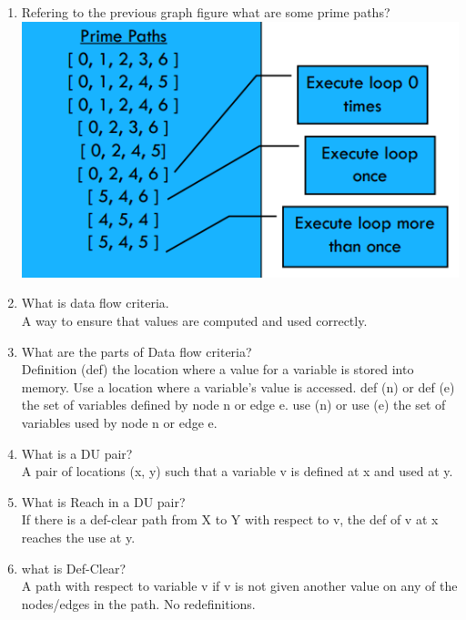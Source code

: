 \documentclass[10pt]{article}
\begin{document}
\begin{enumerate}
      \item Refering to the previous graph figure what are some prime paths?\\
            \includegraphics*[scale=.5]{primepaths.png}\\

      \item What is data flow criteria.\\
            A way to ensure that values are computed and used correctly.\\

      \item What are the parts of Data flow criteria?\\
            Definition (def) the location where a value for a variable is stored into memory. Use a location where a variable's value is accessed. def (n) or def (e) the set of variables defined by node n or edge e.
            use (n) or use (e) the set of variables used by node n or edge e.\\

      \item What is a DU pair?\\
            A pair of locations (x, y) such that a variable v is defined at x and used at y.\\

      \item What is Reach in a DU pair?\\
            If there is a def-clear path from X to Y with respect to v, the def of v at x reaches the use at y.\\

      \item what is Def-Clear?\\
            A path with respect to variable v if v is not given another value on any of the nodes/edges in the path. No redefinitions.\\


\end{enumerate}
\end{document}
